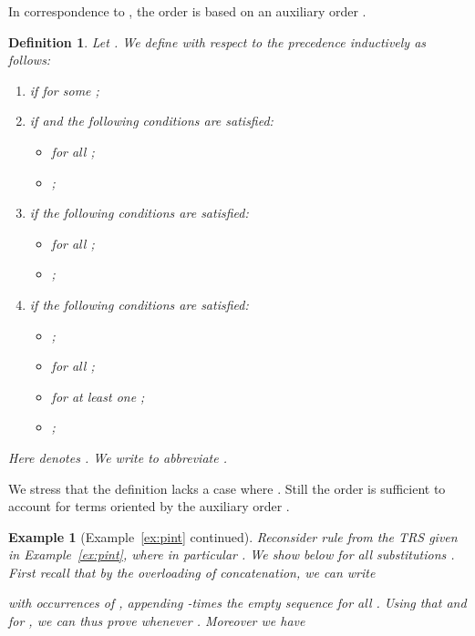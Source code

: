 \documentclass{LMCS}
\newtheorem{example}[thm]{Example}
\newtheorem{definition}[thm]{Definition}
\begin{document}
In correspondence to , the order  
is based on an auxiliary order .

\begin{definition}\label{d:gppv} 
  Let .
  We define  with respect to the precedence  inductively as follows:
  \begin{enumerate}[labelsep=*,leftmargin=*]
  \item\label{d:gppv:st}
     if   for some ;
  \item\label{d:gppv:ia}
     if  and the following conditions are satisfied:
    \begin{itemize}
    \item  for all ;
    \item ;
    \end{itemize}
  \item\label{d:gppv:ialst}
     if the following conditions are satisfied:
    \begin{itemize}
    \item  for all ;
    \item ;
    \end{itemize}
  \item\label{d:gppv:ms} 
     if the following conditions are satisfied:
    \begin{itemize}
    \item ;
    \item  for all ;
    \item  for at least one ;
    \item ;
    \end{itemize}
  \end{enumerate}
  Here  denotes .  We write
   to abbreviate .
\end{definition}

We stress that the definition
lacks a case  where .
Still the order is sufficient to account for 
terms oriented by the auxiliary order .

\begin{example}[Example~\ref{ex:pint} continued]\label{ex:gppv}
  Reconsider rule  from the TRS  given in Example~\ref{ex:pint}, where
  in particular .
  We show below  
  for all substitutions . 
First recall that by the overloading of concatenation, we can write
  
  with  occurrences of , appending -times the empty sequence  
  for all . 
  Using that  and  
  for , 
  we can thus prove  whenever .
  Moreover we have
  
\end{example}
\end{document}
